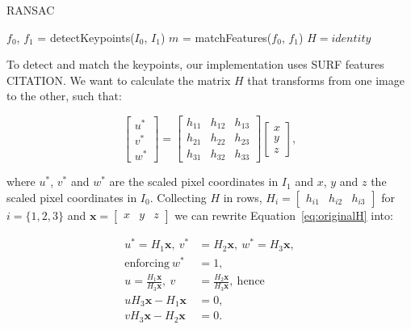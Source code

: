 \documentclass[12pt]{article}
\begin{document}
\begin{algorithm}[H]
 \caption{RANSAC}
 $f_0$, $f_1$ = detectKeypoints($I_0$, $I_1$)\;
 $m$ = matchFeatures($f_0$, $f_1$)\;
 $H = identity$\;
\end{algorithm}

To detect and match the keypoints, our implementation uses SURF features CITATION.
We want to calculate the matrix $H$ that transforms from one image to the other, such that:

\begin{equation}
\begin{bmatrix}
u^* \\ 
v^* \\ 
w^*
\end{bmatrix}
= 
\begin{bmatrix}
 h_{11} & h_{12} & h_{13} \\ 
 h_{21} & h_{22} & h_{23}\\ 
 h_{31} & h_{32} & h_{33}
\end{bmatrix}
\begin{bmatrix}
x \\
y \\
z
\end{bmatrix},
\label{eq:originalH}
\end{equation}

where $u^*$, $v^*$ and $w^*$ are the scaled pixel coordinates in $I_1$ and $x$, $y$ and $z$ the scaled pixel coordinates in $I_0$.
Collecting $H$ in rows, $H_i = \begin{bmatrix} h_{i1} & h_{i2} & h_{i3} \end{bmatrix}$ for $i = \lbrace 1,2,3 \rbrace$ and $\mathbf{x} = \begin{bmatrix} x & y & z \end{bmatrix}$ we can rewrite Equation~\ref{eq:originalH} into:

\begin{equation}
\begin{aligned}
	u^* = H_1 \mathbf{x}, \: v^* &= H_2 \mathbf{x}, \: w^* = H_3 \mathbf{x}, \\ 
	\text{enforcing} \: w^* &= 1, \\
	u = \frac{H_1 \mathbf{x}}{ H_3 \mathbf{x}}, \: v &= \frac{H_2 \mathbf{x}}{ H_3 \mathbf{x}}, \: \text{hence} \\
	uH_3\mathbf{x} - H_1\mathbf{x} &= 0, \\
	vH_3\mathbf{x} - H_2\mathbf{x} &= 0.
\end{aligned}
\label{eq:derivatingH}
\end{equation}
\end{document}

